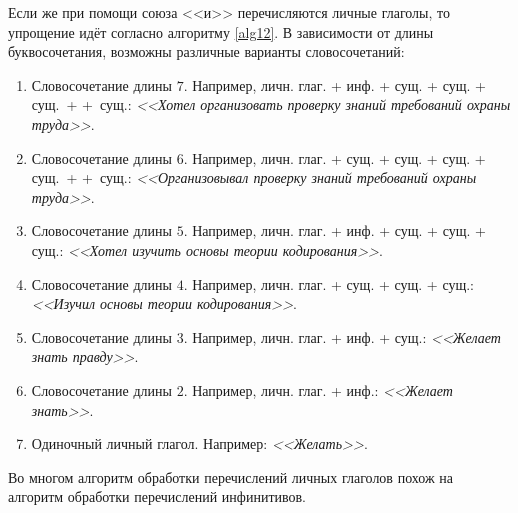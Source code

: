\documentclass[main]{subfiles}
\begin{document}
Если же при помощи союза <<и>> перечисляются личные глаголы, то упрощение идёт согласно алгоритму \ref{alg12}. В зависимости от длины буквосочетания, возможны различные варианты словосочетаний:
\begin{enumerate}
	\item Словосочетание длины $7$. Например, личн. глаг. + инф. + сущ. + сущ. + сущ.~+ +~сущ.: \textit{<<Хотел организовать проверку знаний требований охраны труда>>}.
	\item Словосочетание длины $6$. Например, личн. глаг. + сущ. + сущ. + сущ. + сущ.~+ +~сущ.: \textit{<<Организовывал проверку знаний требований охраны труда>>}.
	\item Словосочетание длины $5$. Например, личн. глаг. + инф. + сущ. + сущ. + сущ.: \textit{<<Хотел изучить основы теории кодирования>>}.
	\item Словосочетание длины $4$. Например, личн. глаг. + сущ. + сущ. + сущ.: \textit{<<Изучил основы теории кодирования>>}.
	\item Словосочетание длины $3$. Например, личн. глаг. + инф. + сущ.: \textit{<<Желает знать правду>>}.
	\item Словосочетание длины $2$. Например, личн. глаг. + инф.: \textit{<<Желает знать>>}.
	\item Одиночный личный глагол. Например: \textit{<<Желать>>}.
\end{enumerate}

Во многом алгоритм обработки перечислений личных глаголов похож на алгоритм обработки перечислений инфинитивов.
\end{document}
